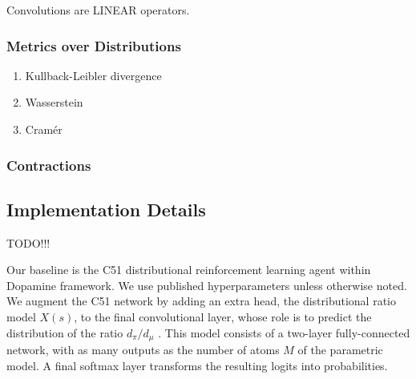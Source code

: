 \documentclass[12pt,a4paper,openright,twoside]{article}
\numberwithin{equation}{section}
\theoremstyle{definition}
\theoremstyle{remark}
\theoremstyle{plain}
\begin{document}
Convolutions are LINEAR operators.



\subsubsection*{Metrics over Distributions}

\begin{enumerate}
 \item Kullback-Leibler divergence
 \item Wasserstein
 \item Cramér	
\end{enumerate}


\subsubsection*{Contractions}



\subsection{Implementation Details}

TODO!!!

Our baseline is the C51 distributional reinforcement learning agent\cite{DRL} within Dopamine framework\cite{dopamine}. We use published hyperparameters unless otherwise noted. We augment the C51 network by adding an extra head, the distributional ratio model $X(s)$, to the final convolutional layer, whose role is to predict the distribution of the ratio $d_\pi / d_\mu$ . This model consists of a two-layer fully-connected network, with as many outputs as the number of atoms $M$ of the parametric model. A final softmax layer transforms the resulting logits into probabilities. 

\newpage
\end{document}
